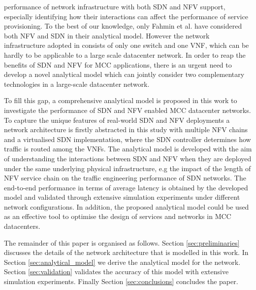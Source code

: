 performance of network infrastructure with both SDN and NFV support, especially identifying how their interactions can affect the performance of service provisioning. To the best of our knowledge, only Fahmin et al. \cite{FahminLHLS17} have considered both NFV and SDN in their analytical model. However the network infrastructure adopted in \cite{FahminLHLS17} consists of only one switch and one VNF, which can be hardly to be applicable to a large scale datacenter network. In order to reap the benefits of SDN and NFV for MCC applications, there is an urgent need to develop a novel analytical model which can jointly consider two complementary technologies in a large-scale datacenter network. 
 
To fill this gap, a comprehensive analytical model is proposed in this work to investigate the performance of SDN and NFV enabled MCC datacenter networks. To capture the unique features of real-world SDN and NFV deployments a network architecture is firstly abstracted in this study with multiple NFV chains and a virtualised SDN implementation, where the SDN controller determines how traffic is routed among the VNFs. The analytical model is developed with the aim of understanding the interactions between SDN and NFV when they are deployed under the same underlying physical infrastructure, e.g the impact of the length of NFV service chain on the traffic engineering performance of SDN networks. The end-to-end performance in terms of average latency is obtained by the developed model and validated through extensive simulation experiments under different network configurations. In addition, the proposed analytical model could be used as an effective tool to optimise the design of services and networks in MCC datacenters.

The remainder of this paper is organised as follows. Section \ref{sec:preliminaries} discusses the details of the network architecture that is modelled in this work. In Section \ref{sec:analytical_model} we derive the analytical model for the network. Section \ref{sec:validation} validates the accuracy of this model with extensive simulation experiments. Finally Section \ref{sec:conclusions} concludes the paper.